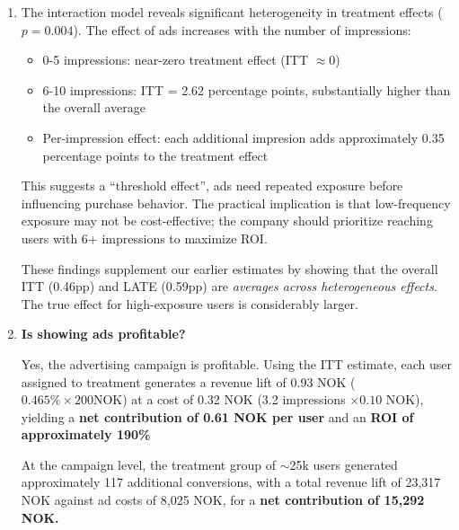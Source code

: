\documentclass[10pt]{article}
\begin{document}
\begin{enumerate}
    \textbf{Interpretation}: For every 1,000 users who see the ad, we expect approximately 6 additional conversions compared to not showing ads. The LATE is larger than the ITT because the ITT is diluted by never-takers (users assigned to treatment who never visited the site). 

    Note: We do not report an ATET estimate because it would suffer from selection bias, as mentioned in task 1.
    \item The interaction model reveals significant heterogeneity in treatment effects ($p = 0.004 $). The effect of ads increases with the number of impressions: 
    \begin{itemize}
        \item 0-5 impressions: near-zero treatment effect (ITT $\approx 0 $)
        \item 6-10 impressions: ITT = 2.62 percentage points, substantially higher than the overall average 
        \item Per-impression effect: each additional impresion adds approximately 0.35 percentage points to the treatment effect 
    \end{itemize}
    This suggests a ``threshold effect'', ads need repeated exposure before influencing purchase behavior. The practical implication is that low-frequency exposure may not be cost-effective; the company should prioritize reaching users with 6+ impressions to maximize ROI. 

    These findings supplement our earlier estimates by showing that the overall ITT (0.46pp) and LATE (0.59pp) are \textit{averages across heterogeneous effects}. The true effect for high-exposure users is considerably larger. 
    \item \textbf{Is showing ads profitable?}

    Yes, the advertising campaign is profitable. Using the ITT estimate, each user assigned to treatment generates a revenue lift of 0.93 NOK ($0.465\%\times 200 \text{NOK} $) at a cost of 0.32 NOK (3.2 impressions $\times 0.10 $ NOK), yielding a \textbf{net contribution of 0.61 NOK per user} and an \textbf{ROI of approximately 190\%}

    At the campaign level, the treatment group of $\sim $25k users generated approximately 117 additional conversions, with a total revenue lift of 23,317 NOK against ad costs of 8,025 NOK, for a \textbf{net contribution of 15,292 NOK.}


\end{enumerate}
\end{document}

